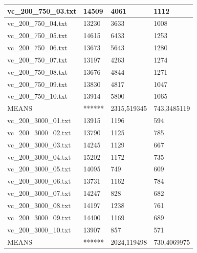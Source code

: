 \documentclass[11pt]{article}
\begin{document}
\begin{table}[!ht]
\begin{tabular}{|l|l|l|l|}
        vc\_200\_750\_03.txt & 14509 & 4061 & 1112 \\ \hline
        vc\_200\_750\_04.txt & 13230 & 3633 & 1008 \\ \hline
        vc\_200\_750\_05.txt & 14615 & 6433 & 1253 \\ \hline
        vc\_200\_750\_06.txt & 13673 & 5643 & 1280 \\ \hline
        vc\_200\_750\_07.txt & 13197 & 4263 & 1274 \\ \hline
        vc\_200\_750\_08.txt & 13676 & 4844 & 1271 \\ \hline
        vc\_200\_750\_09.txt & 13830 & 4817 & 1047 \\ \hline
        vc\_200\_750\_10.txt & 13914 & 5800 & 1065 \\ \hline
        MEANS & ****** & 2315,519345 & 743,3485119 \\ \hline
        vc\_200\_3000\_01.txt & 13915 & 1196 & 594 \\ \hline
        vc\_200\_3000\_02.txt & 13790 & 1125 & 785 \\ \hline
        vc\_200\_3000\_03.txt & 14245 & 1129 & 667 \\ \hline
        vc\_200\_3000\_04.txt & 15202 & 1172 & 735 \\ \hline
        vc\_200\_3000\_05.txt & 14095 & 749 & 609 \\ \hline
        vc\_200\_3000\_06.txt & 13731 & 1162 & 784 \\ \hline
        vc\_200\_3000\_07.txt & 14247 & 828 & 682 \\ \hline
        vc\_200\_3000\_08.txt & 14197 & 1238 & 761 \\ \hline
        vc\_200\_3000\_09.txt & 14400 & 1169 & 689 \\ \hline
        vc\_200\_3000\_10.txt & 13907 & 857 & 571 \\ \hline
        MEANS & ****** & 2024,119498 & 730,4069975 \\ \hline
    \end{tabular}
\end{table}
\end{document}
